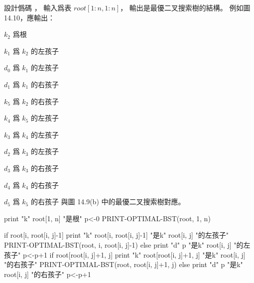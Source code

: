 \startEXERCISE
設計僞碼 ，
輸入爲表 $root[1:n,1:n]$，
輸出是最優二叉搜索樹的結構。
例如圖 14.10，應輸出：

\startigBase
\item $k_2$ 爲根
\item $k_1$ 爲 $k_2$ 的左孩子
\item $d_0$ 爲 $k_1$ 的左孩子
\item $d_1$ 爲 $k_1$ 的右孩子
\item $k_5$ 爲 $k_2$ 的右孩子
\item $k_4$ 爲 $k_5$ 的左孩子
\item $k_3$ 爲 $k_4$ 的左孩子
\item $d_2$ 爲 $k_3$ 的左孩子
\item $d_3$ 爲 $k_3$ 的右孩子
\item $d_4$ 爲 $k_4$ 的右孩子
\item $d_5$ 爲 $k_5$ 的右孩子
\stopigBase
與圖 14.9(b) 中的最優二叉搜索樹對應。
\stopEXERCISE

\startANSWER
{}
\startCLRSCODE
print "k" root[1, n] "是根"
p<-0
PRINT-OPTIMAL-BST(root, 1, n)
\stopCLRSCODE

\startCLRSCODE
if root[i, root[i, j]-1]
	print "k" root[i, root[i, j]-1] "是k" root[i, j] "的左孩子"
	PRINT-OPTIMAL-BST(root, i, root[i, j]-1)
else
	print "d" p "是k" root[i, j] "的左孩子"
	p<-p+1
if root[root[i, j]+1, j]
	print "k" root[root[i, j]+1, j] "是k" root[i, j] "的右孩子"
	PRINT-OPTIMAL-BST(root, root[i, j]+1, j)
else
	print "d" p "是k" root[i, j] "的右孩子"
	p<-p+1
\stopCLRSCODE
\stopANSWER
